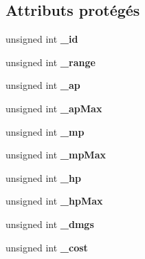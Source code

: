 \subsection*{Attributs protégés}
\begin{DoxyCompactItemize}
\item 
\hypertarget{classUnit_a4ec9562822eaba84e141ee30fc5d5561}{unsigned int {\bfseries \+\_\+id}}\label{classUnit_a4ec9562822eaba84e141ee30fc5d5561}

\item 
\hypertarget{classUnit_a7579bd13c0b683e3275ff84dcd39e614}{unsigned int {\bfseries \+\_\+range}}\label{classUnit_a7579bd13c0b683e3275ff84dcd39e614}

\item 
\hypertarget{classUnit_a968cd238d6ef530d33d2006a6dc80fba}{unsigned int {\bfseries \+\_\+ap}}\label{classUnit_a968cd238d6ef530d33d2006a6dc80fba}

\item 
\hypertarget{classUnit_aa5e25f6bb01279bf6909b631427fc3ae}{unsigned int {\bfseries \+\_\+ap\+Max}}\label{classUnit_aa5e25f6bb01279bf6909b631427fc3ae}

\item 
\hypertarget{classUnit_a84f6e9cf680ab7099e66caa5351ce79a}{unsigned int {\bfseries \+\_\+mp}}\label{classUnit_a84f6e9cf680ab7099e66caa5351ce79a}

\item 
\hypertarget{classUnit_a1fc6881c9ee518068f06636ff62d0a1c}{unsigned int {\bfseries \+\_\+mp\+Max}}\label{classUnit_a1fc6881c9ee518068f06636ff62d0a1c}

\item 
\hypertarget{classUnit_a59c016727ae555e75b61bc4b892d59c8}{unsigned int {\bfseries \+\_\+hp}}\label{classUnit_a59c016727ae555e75b61bc4b892d59c8}

\item 
\hypertarget{classUnit_abad6457e178bd9ca252256f5a18bd6a3}{unsigned int {\bfseries \+\_\+hp\+Max}}\label{classUnit_abad6457e178bd9ca252256f5a18bd6a3}

\item 
\hypertarget{classUnit_a9446a74a19fc662bc46d0a35651d6257}{unsigned int {\bfseries \+\_\+dmgs}}\label{classUnit_a9446a74a19fc662bc46d0a35651d6257}

\item 
\hypertarget{classUnit_a752100201cd0ce04b6a361068eaa65ec}{unsigned int {\bfseries \+\_\+cost}}\label{classUnit_a752100201cd0ce04b6a361068eaa65ec}


\end{DoxyCompactItemize}
